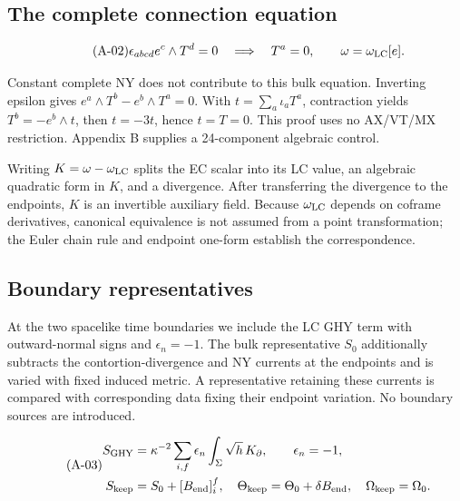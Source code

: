 \subsection{The complete connection equation}

\begin{equation}\tag{A-02}\label{eq:A-02}
\epsilon_{abcd}e^c\wedge T^d=0\quad\Longrightarrow\quad T^a=0,\qquad \omega=\omega_{\rm LC}[e].
\end{equation}

Constant complete NY does not contribute to this bulk equation. Inverting epsilon gives $e^a\wedge T^b-e^b\wedge T^a=0$. With $t=\sum_a\iota_aT^a$, contraction yields $T^b=-e^b\wedge t$, then $t=-3t$, hence $t=T=0$. This proof uses no AX/VT/MX restriction. Appendix B supplies a 24-component algebraic control.

Writing $K=\omega-\omega_{\rm LC}$ splits the EC scalar into its LC value, an algebraic quadratic form in $K$, and a divergence. After transferring the divergence to the endpoints, $K$ is an invertible auxiliary field. Because $\omega_{\rm LC}$ depends on coframe derivatives, canonical equivalence is not assumed from a point transformation; the Euler chain rule and endpoint one-form establish the correspondence.

\subsection{Boundary representatives}

At the two spacelike time boundaries we include the LC GHY term with outward-normal signs and $\epsilon_n=-1$. The bulk representative $S_0$ additionally subtracts the contortion-divergence and NY currents at the endpoints and is varied with fixed induced metric. A representative retaining these currents is compared with corresponding data fixing their endpoint variation. No boundary sources are introduced.

\begin{equation}\tag{A-03}\label{eq:A-03}
\begin{aligned}S_{\rm GHY}&=\kappa^{-2}\sum_{i,f}\epsilon_n\int_{\Sigma}\sqrt h\,K_{\partial},\qquad \epsilon_n=-1,\\ S_{\rm keep}&=S_0+[B_{\rm end}]_i^f,\quad \Theta_{\rm keep}=\Theta_0+\delta B_{\rm end},\quad \Omega_{\rm keep}=\Omega_0.\end{aligned}
\end{equation}

